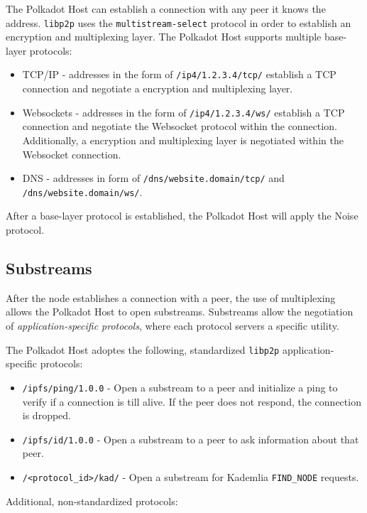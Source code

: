 \documentclass{book}
\begin{document}
The Polkadot Host can establish a connection with any peer it knows the address.
\verb|libp2p| uses the \verb|multistream-select| protocol in order to establish
an encryption and multiplexing layer. The Polkadot Host supports multiple
base-layer protocols:

\begin{itemize}
    \item TCP/IP - addresses in the form of \verb|/ip4/1.2.3.4/tcp/| establish a
    TCP connection and negotiate a encryption and multiplexing layer.
    \item Websockets - addresses in the form of \verb|/ip4/1.2.3.4/ws/|
    establish a TCP connection and negotiate the Websocket protocol within the
    connection. Additionally, a encryption and multiplexing layer is negotiated
    within the Websocket connection.
    \item DNS - addresses in form of \verb|/dns/website.domain/tcp/| and
    \verb|/dns/website.domain/ws/|.
\end{itemize}

After a base-layer protocol is established, the Polkadot Host will apply the
Noise protocol.

\subsection{Substreams}

After the node establishes a connection with a peer, the use of multiplexing
allows the Polkadot Host to open substreams. Substreams allow the negotiation of
\textit{application-specific protocols}, where each protocol servers a specific
utility.

The Polkadot Host adoptes the following, standardized \verb|libp2p|
application-specific protocols:

\begin{itemize}
    \item \verb|/ipfs/ping/1.0.0| - Open a substream to a peer and initialize a
    ping to verify if a connection is till alive. If the peer does not respond,
    the connection is dropped.
    \item \verb|/ipfs/id/1.0.0| - Open a substream to a peer to ask information
    about that peer.
    \item \verb|/<protocol_id>/kad/| - Open a substream for Kademlia
    \verb|FIND_NODE| requests.
\end{itemize}

Additional, non-standardized protocols:
\end{document}
